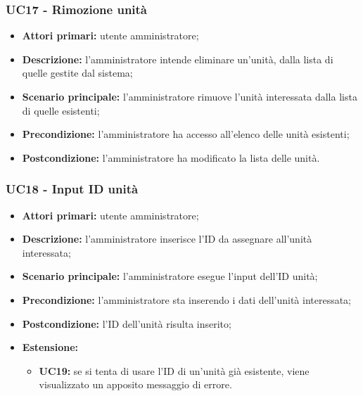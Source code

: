 \subsubsection{UC17 - Rimozione unità}
	\begin{itemize}
		\item \textbf{Attori primari:} utente amministratore;
		\item \textbf{Descrizione:} l'amministratore intende eliminare un'unità, dalla lista di quelle gestite dal sistema;
		\item \textbf{Scenario principale:} l'amministratore rimuove l'unità interessata dalla lista di quelle esistenti;
		\item \textbf{Precondizione:} l'amministratore ha accesso all'elenco delle unità esistenti;
		\item \textbf{Postcondizione:} l'amministratore ha modificato la lista delle unità.
	\end{itemize}

\subsubsection{UC18 - Input ID unità}
	\begin{itemize}
		\item \textbf{Attori primari:} utente amministratore;
		\item \textbf{Descrizione:} l'amministratore inserisce l'ID da assegnare all'unità interessata;
		\item \textbf{Scenario principale:} l'amministratore esegue l'input dell'ID unità;
		\item \textbf{Precondizione:} l'amministratore sta inserendo i dati dell'unità interessata;
		\item \textbf{Postcondizione:} l'ID dell'unità risulta inserito;
		\item \textbf{Estensione:}
		\begin{itemize}
			\item \textbf{UC19:} se si tenta di usare l'ID di un'unità già esistente, viene visualizzato un apposito messaggio di errore.
		\end{itemize}
	\end{itemize}

